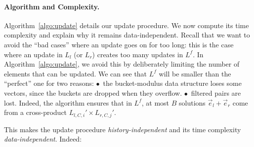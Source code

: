 
\paragraph{Algorithm and Complexity.}
Algorithm~\ref{algo:update} details our update procedure. We now compute its time complexity and explain why it remains data-independent. Recall that we want to avoid the ``bad cases'' where an update goes on for too long: this is the case where an update in $L_l$ (or $L_r$) creates too many updates in $L^f$. In Algorithm~\ref{algo:update}, we avoid this by deliberately limiting the number of elements that can be updated. We can see that $L^f$ will be smaller than the ``perfect'' one for two reasons: $\bullet$~the bucket-modulus data structure loses some vectors, since the buckets are dropped when they overflow. $\bullet$~filtered pairs are lost. Indeed, the algorithm ensures that in $L^f$, at most $B$ solutions $\vec{e}_l + \vec{e}_r$ come from a cross-product $L_{l,C,i}' \times L_{r,C,j}'$.

This makes the update procedure \emph{history-independent} and its time complexity \emph{data-independent}. Indeed:

